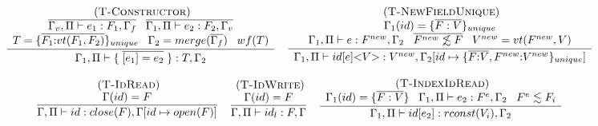 \documentclass[10pt]{sigplanconf}
\newcommand{\mylabel}[1]{\; (\textsc{#1})}
\newcommand{\env}{\Gamma}
\newcommand{\penv}{\Pi}
\begin{document}
\begin{figure*}[t]
{\footnotesize
\[
\begin{array}{c}
\begin{array}{c}
\mylabel{T-Constructor}\\
\dfrac{\begin{array}{c}
	\overline{\env_v, \penv \vdash e_1: F_1, \env_f}
	\;\;\;
\overline{\env_1, \penv \vdash e_2: F_2, \env_v}	\\
	T = \{\overline{F_1{:}vt(F_1,F_2)}\}_{unique} \;\;\;
	\env_{2} = merge(\overline{\env_{f}}) \;\;\; wf(T)
	\end{array}}
{\env_{1}, \penv \vdash \{\;\overline{[e_{1}] = e_{2}}\;\}:T, \env_{2}}
\end{array}
\begin{array}{c}
\mylabel{T-NewFieldUnique}\\
\dfrac{\begin{array}{c}
	\env_{1}(id) = \{ \overline{F:V} \}_{unique}\\
	\env_{1}, \penv \vdash e:F^{new}, \env_{2} \;\;\;
	\overline{F^{new} \not\lesssim F} \;\;\;
	V^{new} = vt(F^{new}, V)
	\end{array}}
{\begin{array}{l}
	\env_{1}, \penv \vdash id[e] {<}V{>}:V^{new},
	\env_{2}[id \mapsto \{ \overline{F{:}V}, F^{new}{:}V^{new}\}_{unique}]
	\end{array}}
\end{array}\\\\
\begin{array}{c}
\mylabel{T-IdRead}\\
\dfrac{\env(id) = F}
{\env, \penv \vdash id:close(F), \env[id \mapsto open(F)]}
\end{array}
\begin{array}{c}
\mylabel{T-IdWrite}\\
\dfrac{\env(id) = F}
{\env, \penv \vdash id_{l}:F, \env}
\end{array}
\begin{array}{c}
\mylabel{T-IndexIdRead}\\
\dfrac{\begin{array}{c}
	\env_{1}(id) = \{\overline{F:V}\} \;\;\;
	\env_{1}, \penv \vdash e_{2}:F^e, \env_{2} \;\;\;
	 F^e \lesssim F_{i}
	\end{array}}
{\env_{1}, \penv \vdash id[e_{2}]:rconst(V_{i}), \env_{2}}
\end{array}
\\ \\

\end{array}\]}
\end{figure*}
\end{document}
